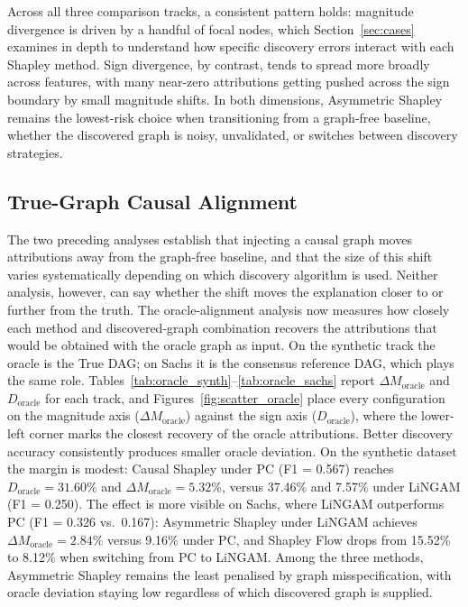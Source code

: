 \documentclass[12pt,a4paper,oneside]{article}
\begin{document}
Across all three comparison tracks, a consistent pattern holds: magnitude divergence is driven by a handful of focal nodes, which Section~\ref{sec:cases} examines in depth to understand how specific discovery errors interact with each Shapley method. Sign divergence, by contrast, tends to spread more broadly across features, with many near-zero attributions getting pushed across the sign boundary by small magnitude shifts. In both dimensions, Asymmetric Shapley remains the lowest-risk choice when transitioning from a graph-free baseline, whether the discovered graph is noisy, unvalidated, or switches between discovery strategies.

\subsection{True-Graph Causal Alignment}
\label{sec:oracle_align}

The two preceding analyses establish that injecting a causal graph moves attributions away from the graph-free baseline, and that the size of this shift varies systematically depending on which discovery algorithm is used. Neither analysis, however, can say whether the shift moves the explanation closer to or further from the truth. The oracle-alignment analysis now measures how closely each method and discovered-graph combination recovers the attributions that would be obtained with the oracle graph as input. On the synthetic track the oracle is the True DAG; on Sachs it is the consensus reference DAG, which plays the same role. Tables~\ref{tab:oracle_synth}--\ref{tab:oracle_sachs} report $\Delta M_{\text{oracle}}$ and $D_{\text{oracle}}$ for each track, and Figures~\ref{fig:scatter_oracle} place every configuration on the magnitude axis ($\Delta M_{\text{oracle}}$) against the sign axis ($D_{\text{oracle}}$), where the lower-left corner marks the closest recovery of the oracle attributions. Better discovery accuracy consistently produces smaller oracle deviation. On the synthetic dataset the margin is modest: Causal Shapley under PC (F1 = 0.567) reaches $D_{\text{oracle}} = 31.60\%$ and $\Delta M_{\text{oracle}} = 5.32\%$, versus 37.46\% and 7.57\% under LiNGAM (F1 = 0.250). The effect is more visible on Sachs, where LiNGAM outperforms PC (F1 = 0.326 vs.\ 0.167): Asymmetric Shapley under LiNGAM achieves $\Delta M_{\text{oracle}} = 2.84\%$ versus 9.16\% under PC, and Shapley Flow drops from 15.52\% to 8.12\% when switching from PC to LiNGAM. Among the three methods, Asymmetric Shapley remains the least penalised by graph misspecification, with oracle deviation staying low regardless of which discovered graph is supplied.
\end{document}

